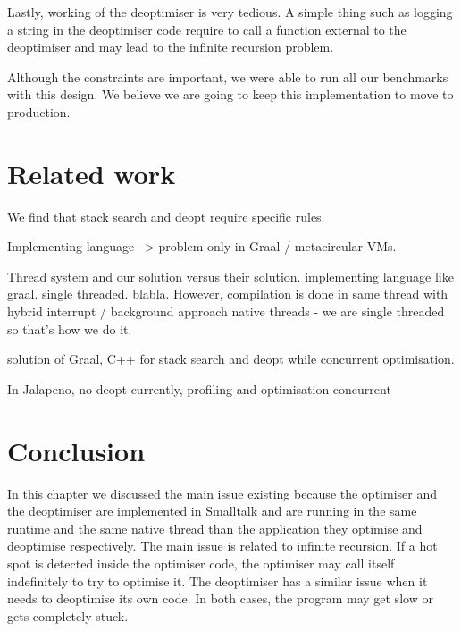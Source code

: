 \documentclass[a4paper,12pt,twoside]{../includes/ThesisStyle}
\begin{document}
Lastly, working of the deoptimiser is very tedious. A simple thing such as logging a string in the deoptimiser code require to call a function external to the deoptimiser and may lead to the infinite recursion problem.

Although the constraints are important, we were able to run all our benchmarks with this design. We believe we are going to keep this implementation to move to production.


\section{Related work}

We find that stack search and deopt require specific rules. 

Implementing language --> problem only in Graal / metacircular VMs.

Thread system and our solution versus their solution.
implementing language like graal. single threaded. blabla.
However, compilation is done in same thread with hybrid interrupt / background approach
native threads - we are single threaded so that's how we do it.

solution of Graal, C++ for stack search and deopt while concurrent optimisation.

In Jalapeno, no deopt currently, profiling and optimisation concurrent 


\section{Conclusion}

In this chapter we discussed the main issue existing because the optimiser and the deoptimiser are implemented in Smalltalk and are running in the same runtime and the same native thread than the application they optimise and deoptimise respectively. The main issue is related to infinite recursion. If a hot spot is detected inside the optimiser code, the optimiser may call itself indefinitely to try to optimise it. The deoptimiser has a similar issue when it needs to deoptimise its own code. In both cases, the program may get slow or gets completely stuck.
\end{document}
